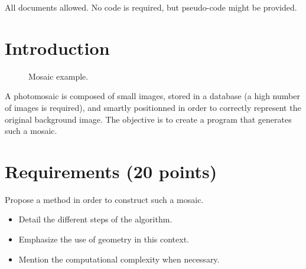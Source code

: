 
\begin{note}All documents allowed. No code is required, but pseudo-code might be provided.\end{note}

\section{Introduction}

\begin{figure}[htbp]
\centering
{}
\hfill
{}
\caption{Mosaic example.}
\end{figure}

A photomosaic is composed of small images, stored in a database (a high number of images is required), and smartly positionned in order to correctly represent the original background image. The objective is to create a program that generates such a mosaic.

\section{Requirements (20 points)}

\begin{qbox}
Propose a method in order to construct such a mosaic. 

\begin{itemize}
 \item Detail the different steps of the algorithm. 
\item Emphasize the use of geometry in this context. 
\item Mention the computational complexity when necessary.
\end{itemize}
\end{qbox}
